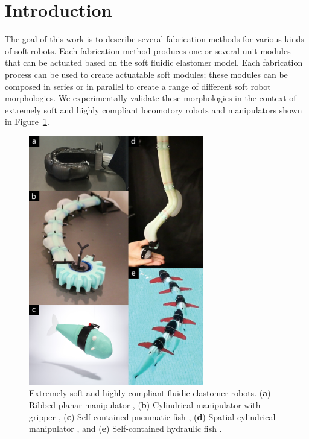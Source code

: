 
\section{Introduction}
\label{sec:Introduction}
The goal of this work is to describe several fabrication methods for various kinds of soft robots.
Each fabrication method produces one or several unit-modules that can be actuated based on the soft fluidic elastomer model.
Each fabrication process can be used to create actuatable soft modules; these modules can be composed in series or in parallel to create a range of different soft robot morphologies.
%
We experimentally validate these morphologies in the context of extremely soft and highly compliant locomotory robots and manipulators shown in Figure~\ref{fig:intro_new}.

\begin{figure}[!t]
  \centering
  \includegraphics[width=3in]{figures/introduction/intronew_v2.jpg}
  \caption{Extremely soft and highly compliant fluidic elastomer robots. (\textbf{a}) Ribbed planar manipulator \citep{marchese2014design}, (\textbf{b}) Cylindrical manipulator with gripper \citep{katzschmann2015autonomous}, (\textbf{c}) Self-contained pneumatic fish \citep{marchese2014autonomous}, (\textbf{d}) Spatial cylindrical manipulator \citep{marchese2015design}, and (\textbf{e}) Self-contained hydraulic fish \citep{katzschmann2014hydraulic}. }\label{fig:intro_new}
\end{figure}

